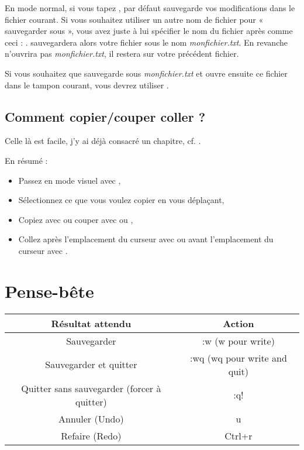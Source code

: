 En mode normal, si vous tapez , \vim par défaut sauvegarde vos modifications dans le fichier courant. Si vous souhaitez utiliser un autre nom de fichier pour « sauvegarder sous », vous avez juste à lui spécifier le nom du fichier après  comme ceci : . \vim sauvegardera alors votre fichier sous le nom \emph{monfichier.txt}. En revanche \vim n'ouvrira pas \emph{monfichier.txt}, il restera sur votre précédent fichier.

Si vous souhaitez que \vim sauvegarde sous \emph{monfichier.txt} et ouvre ensuite ce fichier dans le tampon courant, vous devrez utiliser .

\subsection{Comment copier/couper coller ?}

Celle là est facile, j'y ai déjà consacré un chapitre, cf. . 

En résumé : 

\begin{itemize}
    \item Passez en mode visuel avec \ttv,
    \item Sélectionnez ce que vous voulez copier en vous déplaçant,
    \item Copiez avec \tty\xspace ou couper avec \ttx ou \ttd,
    \item Collez après l'emplacement du curseur avec \ttp ou avant l'emplacement du curseur avec \ttP.
\end{itemize}

\section{Pense-bête}

\bigskip
\begin{tabular}[H]{|c|c|}
  \hline
  Résultat attendu & Action\\
  \hline
  Sauvegarder & :w (w pour write)\\
  Sauvegarder et quitter & :wq (wq pour write and quit)\\
  Quitter sans sauvegarder (forcer à quitter) & :q! \\
  Annuler (Undo) & u \\
  Refaire (Redo) & Ctrl+r \\
  \hline
\end{tabular}
\bigskip

